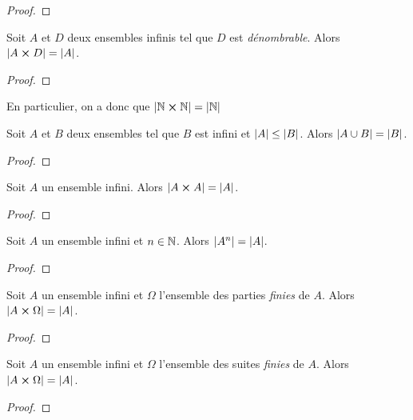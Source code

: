 \begin{proof}

\end{proof}

\begin{theorem}
	\label{thm:cartesian_product_denombrable_infini_infini}
	Soit $A$ et $D$ deux ensembles infinis tel que $D$ est \textit{dénombrable}.
	Alors $|A \cross D| = |A|$.
\end{theorem}

\begin{proof}

\end{proof}

En particulier, on a donc que $|\mathbb{N} \cross \mathbb{N}| = |\mathbb{N}|$

\begin{corollary}
	\label{cor:union_infini_set}
	Soit $A$ et $B$ deux ensembles tel que $B$ est infini et $|A| \leq |B|$.
	Alors $|A \cup B| = |B|$.
\end{corollary}

\begin{proof}
	
\end{proof}

\begin{theorem}
	Soit $A$ un ensemble infini. Alors $|A \cross A| = |A|$.
	\label{thm:card_cart_product_infini}
\end{theorem}

\begin{proof}
	
\end{proof}

\begin{corollary}
	Soit $A$ un ensemble infini et $n \in \mathbb{N}$. Alors $|A^{n}| =
	|A|$.
\end{corollary}

\begin{proof}
	
\end{proof}

\begin{corollary}
	Soit $A$ un ensemble infini et $\Omega$ l'ensemble des parties
	\textit{finies} de $A$. Alors $|A \cross \Omega| = |A|$.
\end{corollary}

\begin{proof}
	
\end{proof}

\begin{corollary}
	Soit $A$ un ensemble infini et $\Omega$ l'ensemble des suites
	\textit{finies} de $A$. Alors $|A \cross \Omega| = |A|$.
\end{corollary}

\begin{proof}
	
\end{proof}

